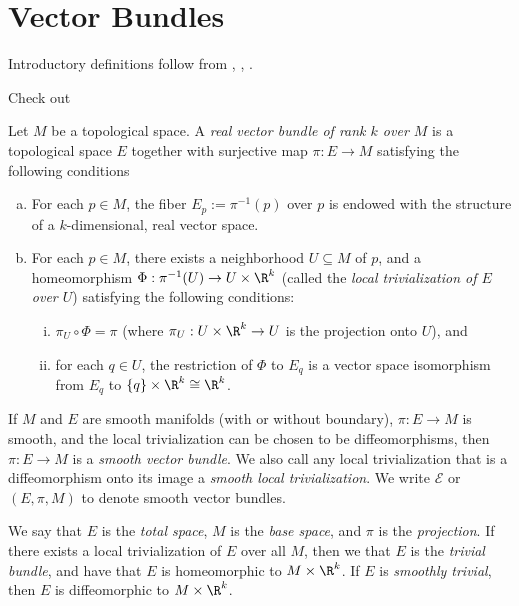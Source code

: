 



\section{Vector Bundles}
\begin{tcolorbox}
Introductory definitions follow from \cite{kolar1999natural}, \cite{lee2003smooth}, \cite{ryan2014geometry}.

Check out \cite{borisenko1991riemannian}
\end{tcolorbox}


Let $M$ be a topological space.  A \textit{real vector bundle of rank $k$ over $M$} is a topological space $E$ together with surjective map $\pi:E\to M$ satisfying the following conditions
\begin{enumerate}[a.]
	\item For each $p\in M$, the fiber $E_p:=\pi^{-1}(p)$ over $p$ is endowed with the structure of a $k$-dimensional, real vector space.
	\item For each $p\in M$, there exists a neighborhood $U\subseteq M$ of $p$, and a homeomorphism $\Phi:\pi^{-1}(U)\to U\times\R^k$ (called the \textit{local trivialization of $E$ over $U$}) satisfying the following conditions:
		\begin{enumerate}[i.]
			\item $\pi_U\circ\Phi=\pi$ (where $\pi_U:U\times\R^k\to U$ is the projection onto $U$), and
			\item for each $q\in U$, the restriction of $\Phi$ to $E_q$ is a vector space isomorphism from $E_q$ to $\{q\}\times\R^k\cong\R^k$.
		\end{enumerate}
\end{enumerate}

If $M$ and $E$ are smooth manifolds (with or without boundary), $\pi:E\to M$ is smooth, and the local trivialization can be chosen to be diffeomorphisms, then $\pi:E\to M$ is a \textit{smooth vector bundle}.  We also call any local trivialization that is a diffeomorphism onto its image a \textit{smooth local trivialization}.  We write $\mathcal{E}$ or $(E,\pi,M)$ to denote smooth vector bundles.

We say that $E$ is the \textit{total space}, $M$ is the \textit{base space}, and $\pi$ is the \textit{projection}.  If there exists a local trivialization of $E$ over all $M$, then we that $E$ is the \textit{trivial bundle}, and have that $E$ is homeomorphic to $M\times\R^k$.  If $E$ is \textit{smoothly trivial}, then $E$ is diffeomorphic to $M\times\R^k$.  


